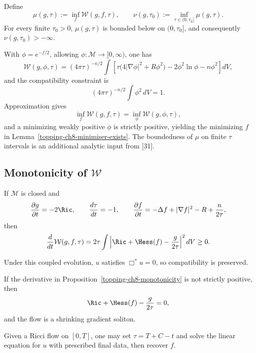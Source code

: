 Define
\[
\mu(g,\tau):=\inf_f\mathcal W(g,f,\tau),
\qquad
\nu(g,\tau_0):=\inf_{\tau\in(0,\tau_0]}\mu(g,\tau).
\]
For every finite $\tau_0>0$, $\mu(g,\tau)$ is bounded below on
$(0,\tau_0]$, and consequently $\nu(g,\tau_0)>-\infty$.

With $\phi=e^{-f/2}$, allowing $\phi:\mathcal M\to[0,\infty)$, one has
\[
\mathcal W(g,\phi,\tau)
=(4\pi\tau)^{-n/2}\int\left[
\tau\bigl(4|\nabla\phi|^2+R\phi^2\bigr)-2\phi^2\ln\phi-n\phi^2
\right]dV,
\]
and the compatibility constraint is
\[
(4\pi\tau)^{-n/2}\int\phi^2\,dV=1.
\]
Approximation gives
\[
\inf_f\mathcal W(g,f,\tau)=\inf_\phi\mathcal W(g,\phi,\tau),
\]
and a minimizing weakly positive $\phi$ is strictly positive, yielding the
minimizing $f$ in Lemma~\ref{topping-ch8-minimiser-exists}. The boundedness of $\mu$ on finite $\tau$
intervals is an additional analytic input from [31].
\subsection{Monotonicity of $\mathcal W$}

\begin{proposition}
\label{topping-ch8-monotonicity}
If $\mathcal M$ is closed and
\[
\frac{\partial g}{\partial t}=-2\Ric,\qquad
\frac{d\tau}{dt}=-1,\qquad
\frac{\partial f}{\partial t}=-\Delta f+|\nabla f|^2-R+\frac{n}{2\tau},
\]
then
\[
\frac{d}{dt}\mathcal W(g,f,\tau)
=2\tau\int\left|\Ric+\Hess(f)-\frac{g}{2\tau}\right|^2dV\geq0.
\]
\end{proposition}

\begin{remark}
\label{topping-ch8-compatibility-preserved}
Under this coupled evolution, $u$ satisfies $\Box^*u=0$, so compatibility is
preserved.
\end{remark}

\begin{remark}
\label{topping-ch8-shrinking-soliton}
If the derivative in Proposition~\ref{topping-ch8-monotonicity} is not strictly positive, then
\[
\Ric+\Hess(f)-\frac{g}{2\tau}=0,
\]
and the flow is a shrinking gradient soliton.
\end{remark}

\begin{remark}
\label{topping-ch8-existence-of-coupled-system}
Given a Ricci flow on $[0,T]$, one may set $\tau=T+C-t$ and solve the linear
equation for $u$ with prescribed final data, then recover $f$.
\end{remark}

